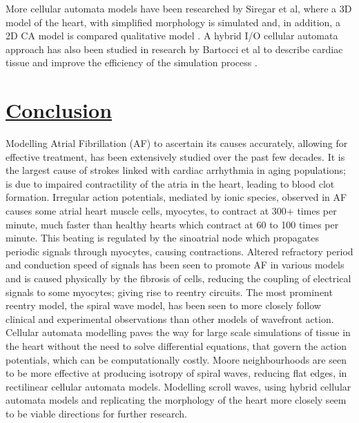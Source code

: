\documentclass[twocolumn]{article}
\begin{document}
More cellular automata models have been researched by Siregar et al, where a 3D model of the heart, with simplified morphology is simulated and, in addition, a 2D CA model is compared qualitative model \cite{Siregar} \cite{Siregar2}. A hybrid I/O cellular automata approach has also been studied in research by Bartocci et al to describe cardiac tissue and improve the efficiency of the simulation process \cite{Bartocci}. 



















\section{\textbf{\underline{Conclusion}}}


Modelling Atrial Fibrillation (AF) to ascertain its causes accurately, allowing for effective treatment, has been extensively studied over the past few decades. It is the largest cause of strokes linked with cardiac arrhythmia in aging populations; is due to impaired contractility of the atria in the heart, leading to blood clot formation. Irregular action potentials, mediated by ionic species, observed in AF causes some atrial heart muscle cells, myocytes, to contract at 300+ times per minute, much faster than healthy hearts which contract at 60 to 100 times per minute. This beating is regulated by the sinoatrial node which propagates periodic signals through myocytes, causing contractions.  Altered refractory period and conduction speed of signals has been seen to promote AF in various models and is caused physically by the fibrosis of cells, reducing the coupling of electrical signals to some myocytes; giving rise to reentry circuits. The most prominent reentry model, the spiral wave model, has been seen to more closely follow clinical and experimental observations than other models of wavefront action. Cellular automata modelling paves the way for large scale simulations of tissue in the heart without the need to solve differential equations, that govern the action potentials, which can be computationally costly. Moore neighbourhoods are seen to be more effective at producing isotropy of spiral waves, reducing flat edges, in rectilinear cellular automata models. Modelling scroll waves, using hybrid cellular automata models and replicating the morphology of the heart more closely seem to be viable directions for further research. 
\end{document}
